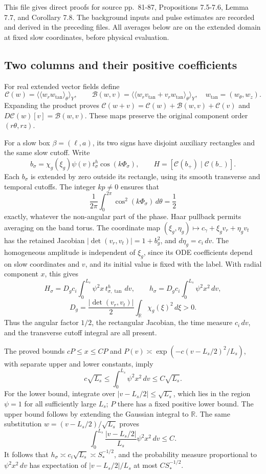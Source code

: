 \documentclass[10pt,a4paper]{article}
\begin{document}
This file gives direct proofs for source pp.~81-87, Propositions 7.5-7.6, Lemma 7.7, and Corollary 7.8. The background inputs and pulse estimates are recorded and derived in the preceding files. All averages below are on the extended domain at fixed slow coordinates, before physical evaluation.

\subsection{Two columns and their positive coefficients}\label{two-columns-and-their-positive-coefficients}

For real extended vector fields define \[
\mathcal C(w)=\langle\langle w_rw_{\tan}\rangle_\theta\rangle_Y,\qquad
\mathcal B(w,v)=
\langle\langle w_rv_{\tan}+v_rw_{\tan}\rangle_\theta\rangle_Y,
\quad w_{\tan}=(w_\theta,w_z).
\] Expanding the product proves \(\mathcal C(w+v)=\mathcal C(w)+\mathcal B(w,v)+\mathcal C(v)\) and \(D\mathcal C(w)[v]=\mathcal B(w,v)\). These maps preserve the original component order \((r\theta,rz)\).

For a slow box \(\beta=(\ell,a)\), its two signs have disjoint auxiliary rectangles and the same slow cutoff. Write \[
b_\sigma=\chi_g(\xi_g)\psi(v)t_\sigma^h\cos(k\Phi_\sigma),\qquad
H=[\mathcal C(b_+)\mid\mathcal C(b_-)].
\] Each \(b_\sigma\) is extended by zero outside its rectangle, using its smooth transverse and temporal cutoffs. The integer \(kp\ne0\) ensures that \[
\frac1{2\pi}\int_0^{2\pi}\cos^2(k\Phi_\sigma)\,d\theta=\frac12
\] exactly, whatever the non-angular part of the phase. Haar pullback permits averaging on the band torus. The coordinate map \((\xi_g,\eta_g)\mapsto c_\gamma+\xi_gv_r+\eta_gv_t\) has the retained Jacobian \(|\det(v_r,v_t)|=1+b_g^2\), and \(d\eta_g=c_i\,dv\). The homogeneous amplitude is independent of \(\xi_g\), since its ODE coefficients depend on slow coordinates and \(v\), and its initial value is fixed with the label. With radial component \(x\), this gives \[
H_\sigma=D_g c_i\int_0^{L_s}\psi^2x\,t_{\sigma,\tan}^h\,dv,\qquad
h_\sigma=D_g c_i\int_0^{L_s}\psi^2x^2\,dv,
\] \[
D_g=\frac{|\det(v_r,v_t)|}{2}\int_{\mathbb R}\chi_g(\xi)^2\,d\xi>0.
\] Thus the angular factor \(1/2\), the rectangular Jacobian, the time measure \(c_i\,dv\), and the transverse cutoff integral are all present.

The proved bounds \(cP\le x\le CP\) and \(P(v)\asymp\exp(-c(v-L_s/2)^2/L_s)\), with separate upper and lower constants, imply \[
c\sqrt{L_s}\le\int_0^{L_s}\psi^2x^2\,dv\le C\sqrt{L_s}.
\] For the lower bound, integrate over \(|v-L_s/2|\le\sqrt{L_s}\), which lies in the region \(\psi=1\) for all sufficiently large \(L_s\); \(P\) there has a fixed positive lower bound. The upper bound follows by extending the Gaussian integral to \(\mathbb R\). The same substitution \(w=(v-L_s/2)/\sqrt{L_s}\) proves \[
\int_0^{L_s}\frac{|v-L_s/2|}{L_s}\psi^2x^2\,dv\le C.
\] It follows that \(h_\sigma\asymp c_i\sqrt{L_s}\asymp S_*^{-1/2}\), and the probability measure proportional to \(\psi^2x^2\,dv\) has expectation of \(|v-L_s/2|/L_s\) at most \(CS_*^{-1/2}\).
\end{document}
